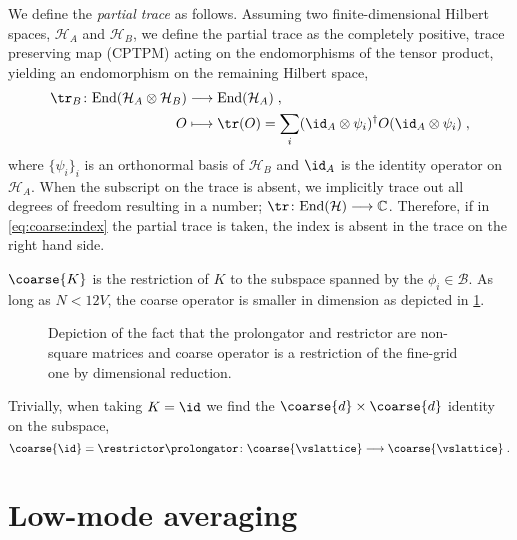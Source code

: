 We define the \emph{partial trace} as follows.
Assuming two finite-dimensional Hilbert spaces, $\mathcal{H}_A$ and $\mathcal{H}_B$, we define the partial trace as the completely positive, trace preserving map (CPTPM) acting on the endomorphisms of the tensor product, yielding an endomorphism on the remaining Hilbert space,
\begin{align} \label{eq:partial:trace}
\begin{aligned}
\tr_B \colon \text{End}(\mathcal{H}_A \otimes \mathcal{H}_B) &\longrightarrow \text{End}(\mathcal{H}_A) \;, \\
O &\longmapsto \tr(O) = \sum_{i} ( \id_A \otimes \psi_i )^{\dagger} O ( \id_A \otimes \psi_i ) \;,
\end{aligned}
\end{align}
where $\{\psi_i\}_i$ is an orthonormal basis of $\mathcal{H}_B$ and $\id_A$ is the identity operator on $\mathcal{H}_A$.
When the subscript on the trace is absent, we implicitly trace out all degrees of freedom resulting in a number; $\tr \colon \text{End}(\mathcal{H}) \longrightarrow \mathbb{C}$.
Therefore, if in \cref{eq:coarse:index} the partial trace is taken, the index is absent in the trace on the right hand side.

$\coarse{K}$ is the restriction of $K$ to the subspace spanned by the $\phi_{i} \in \mathcal{B}$.
As long as $N < 12V$, the coarse operator is smaller in dimension as depicted in \cref{fig:coarsen}.
\begin{figure}
  
  \caption{Depiction of the fact that the prolongator and restrictor are non-square matrices and coarse operator is a restriction of the fine-grid one by dimensional reduction.}
  \label{fig:coarsen}
\end{figure}
Trivially, when taking $K = \id$ we find the $\coarse{d} \times \coarse{d}$ identity on the subspace,
\begin{equation}
\coarse{\id} = \restrictor \prolongator \colon \coarse{\vslattice} \longrightarrow \coarse{\vslattice} \;.
\end{equation}

\section{Low-mode averaging}
\label{sec:sd:lma}

